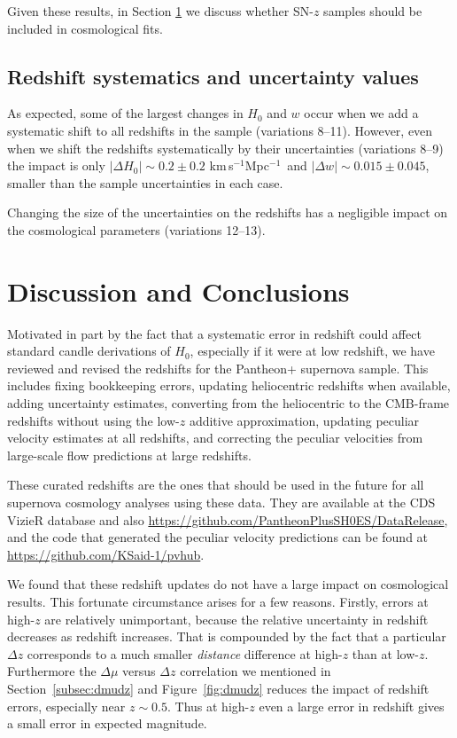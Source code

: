 \documentclass[
  journal=pasa,
  manuscript=research-paper,
  year=2022,
]{cup-journal}
\newcommand{\kmsMpc}{km\,s$^{-1}$Mpc$^{-1}$}
\newcommand{\data}{\url{https://github.com/PantheonPlusSH0ES/DataRelease}}
\newcommand{\pvcode}{\url{https://github.com/KSaid-1/pvhub}}
\begin{document}
Given these results, in Section \ref{sec:discussion_conclusion} we discuss whether SN-$z$ samples should be included in cosmological fits. 


\subsection{Redshift systematics and uncertainty values}
As expected, some of the largest changes in $H_0$ and $w$ occur when we add a systematic shift to all redshifts in the sample (variations 8--11). 
However, even when we shift the redshifts systematically by their uncertainties (variations 8--9) the impact is only $|\Delta H_0|\sim 0.2\pm0.2$ \kmsMpc\ and $|\Delta w|\sim0.015\pm0.045$, smaller than the sample uncertainties in each case.  

Changing the size of the uncertainties on the redshifts has a negligible impact on the cosmological parameters (variations 12--13).  

\section{Discussion and Conclusions}\label{sec:discussion_conclusion}

Motivated in part by the fact that a systematic error in redshift could affect standard candle derivations of $H_0$, especially if it were at low redshift, we have reviewed and revised the redshifts for the Pantheon+ supernova sample. 
This includes fixing bookkeeping errors, updating heliocentric redshifts when available, adding uncertainty estimates, converting from the heliocentric to the CMB-frame redshifts without using the low-$z$ additive approximation, updating peculiar velocity estimates at all redshifts, and correcting the peculiar velocities from large-scale flow predictions at large redshifts. 

These curated redshifts are the ones that should be used in the future for all supernova cosmology analyses using these data.
They are available at the CDS VizieR database and also \data{}, and the code that generated the peculiar velocity predictions can be found at \pvcode{}.

We found that these redshift updates do not have a large impact on cosmological results.
This fortunate circumstance arises for a few reasons.
Firstly, errors at high-$z$ are relatively unimportant, because the relative uncertainty in redshift decreases as redshift increases.
That is compounded by the fact that a particular $\Delta z$ corresponds to a much smaller {\em distance} difference at high-$z$ than at low-$z$.  Furthermore the $\Delta\mu$ versus $\Delta z$ correlation we mentioned in Section~\ref{subsec:dmudz} and Figure~\ref{fig:dmudz} reduces the impact of redshift errors, especially near $z\sim0.5$.
Thus at high-$z$ even a large error in redshift gives a small error in expected magnitude.
\end{document}
